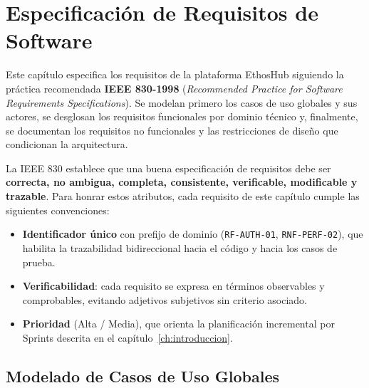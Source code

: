 \chapter{Especificación de Requisitos de Software}
\label{ch:requisitos}

Este capítulo especifica los requisitos de la plataforma EthosHub siguiendo la
práctica recomendada \textbf{IEEE 830-1998} (\textit{Recommended Practice for Software
Requirements Specifications}). Se modelan primero los casos de uso globales y sus
actores, se desglosan los requisitos funcionales por dominio técnico y, finalmente, se
documentan los requisitos no funcionales y las restricciones de diseño que condicionan
la arquitectura.

La IEEE 830 establece que una buena especificación de requisitos debe ser
\textbf{correcta, no ambigua, completa, consistente, verificable, modificable y
trazable}. Para honrar estos atributos, cada requisito de este capítulo cumple las
siguientes convenciones:

\begin{itemize}[noitemsep]
    \item \textbf{Identificador único} con prefijo de dominio (\texttt{RF-AUTH-01},
    \texttt{RNF-PERF-02}), que habilita la trazabilidad bidireccional hacia el código
    y hacia los casos de prueba.
    \item \textbf{Verificabilidad}: cada requisito se expresa en términos observables y
    comprobables, evitando adjetivos subjetivos sin criterio asociado.
    \item \textbf{Prioridad} (Alta / Media), que orienta la planificación incremental
    por Sprints descrita en el capítulo~\ref{ch:introduccion}.
\end{itemize}

\section{Modelado de Casos de Uso Globales}
\label{sec:casos_uso}

